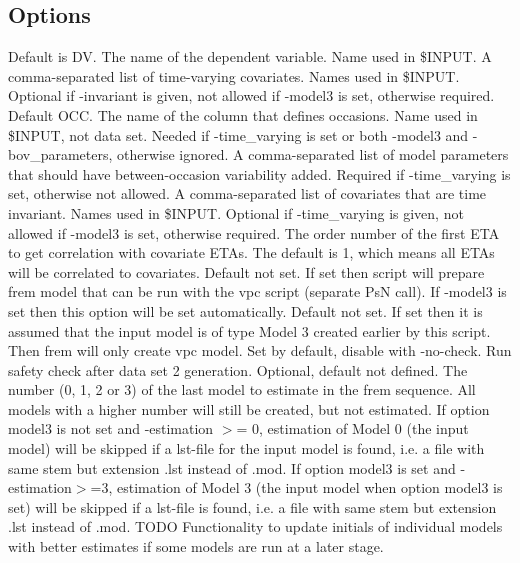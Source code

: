 \subsection{Options}
\begin{optionlist}
Default is DV. The name of the dependent variable. Name used in \$INPUT. 
\nextopt
{}
A comma-separated list of time-varying covariates. Names used in \$INPUT. Optional if -invariant is given, not allowed if -model3 is set, otherwise required. 
\nextopt
{}
Default OCC. The name of the column that defines occasions. Name used in \$INPUT, not data set. Needed if -time\_varying is set or both -model3 and -bov\_parameters, otherwise ignored.   
\nextopt
{}
A comma-separated list of model parameters that should have between-occasion variability added. 
Required if -time\_varying is set, otherwise not allowed. 
\nextopt
{}
A comma-separated list of covariates that are time invariant. Names used in \$INPUT. Optional if -time\_varying is given, not allowed if -model3 is set, otherwise required. 
\nextopt
{}
The order number of the first ETA to get correlation with covariate ETAs. The default is 1, which means all ETAs will be correlated to 
covariates.
\nextopt
{}
Default not set. If set then script will prepare frem model that can be run with the vpc script (separate PsN call). If -model3 is set then this option will be set automatically.  
\nextopt
{}
Default not set. If set then it is assumed that the input model is of type Model 3 created earlier by this script. Then frem will only create vpc model.  
\nextopt
{}
Set by default, disable with -no-check. Run safety check after data set 2 generation. 
\nextopt
{}
Optional, default not defined. The number (0, 1, 2 or 3) of the last model to estimate in the frem sequence. All models with a higher number will still be created, but not estimated. If option model3 is not set and -estimation $>$= 0, estimation of Model 0 (the input model) will be skipped if a lst-file for the input model is found, i.e. a file with same stem but extension .lst instead of .mod. If option model3 is set and -estimation$>$=3, estimation of Model 3 (the input model when option model3 is set) will be skipped if a lst-file is found, i.e. a file with same stem but extension .lst instead of .mod. TODO Functionality to update initials of individual models with better estimates if some models are run at a later stage. 

\end{optionlist}

